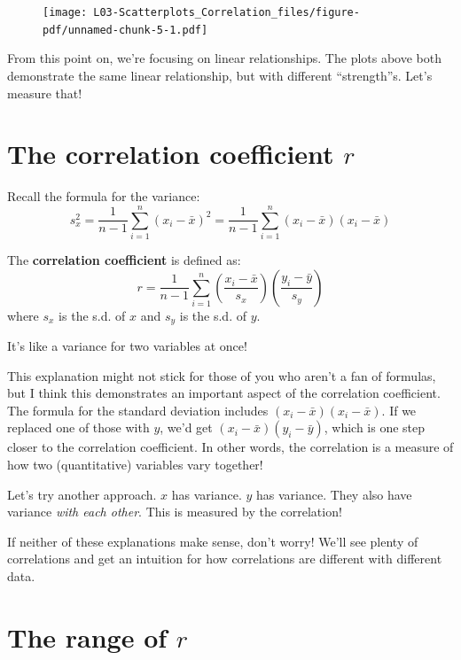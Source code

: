 \documentclass[
  letterpaper,
  DIV=11,
  numbers=noendperiod]{scrreprt}
\begin{document}
\begin{figure}[H]

{\centering \texttt{[image: L03-Scatterplots\_Correlation\_files/figure-pdf/unnamed-chunk-5-1.pdf]}

}

\end{figure}

From this point on, we're focusing on linear relationships. The plots
above both demonstrate the same linear relationship, but with different
``strength''s. Let's measure that!

\hypertarget{the-correlation-coefficient-r}{%
\section{\texorpdfstring{The correlation coefficient
\(r\)}{The correlation coefficient r}}\label{the-correlation-coefficient-r}}

Recall the formula for the variance: \[
s_x^2 = \frac{1}{n-1}\sum_{i=1}^n(x_i - \bar x)^2 = \frac{1}{n-1}\sum_{i=1}^n(x_i - \bar x)(x_i - \bar x) 
\]

The \textbf{correlation coefficient} is defined as: \[
r = \frac{1}{n-1}\sum_{i=1}^n\left(\frac{x_i - \bar x}{s_x}\right)\left(\frac{y_i - \bar y}{s_y}\right)
\] where \(s_x\) is the s.d. of \(x\) and \(s_y\) is the s.d. of \(y\).

\pspace

It's like a variance for two variables at once!

This explanation might not stick for those of you who aren't a fan of
formulas, but I think this demonstrates an important aspect of the
correlation coefficient. The formula for the standard deviation includes
\((x_i - \bar x)(x_i - \bar x)\). If we replaced one of those with
\(y\), we'd get \((x_i - \bar x)(y_i - \bar y)\), which is one step
closer to the correlation coefficient. In other words, the correlation
is a measure of how two (quantitative) variables vary together!

Let's try another approach. \(x\) has variance. \(y\) has variance. They
also have variance \emph{with each other}. This is measured by the
correlation!

If neither of these explanations make sense, don't worry! We'll see
plenty of correlations and get an intuition for how correlations are
different with different data.

\hypertarget{the-range-of-r}{%
\section{\texorpdfstring{The range of
\(r\)}{The range of r}}\label{the-range-of-r}}
\end{document}
